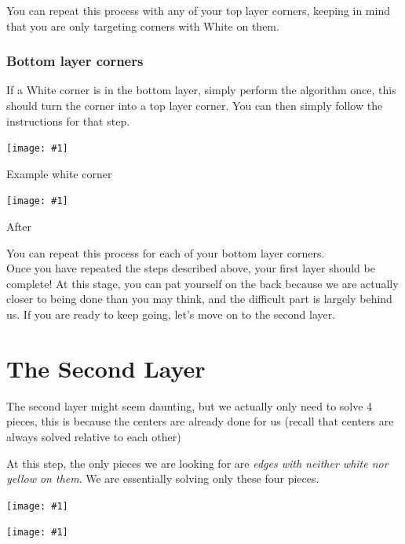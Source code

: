 \documentclass[12pt,letterpaper]{article}
\newcommand{\alg}[1]{
  \tcbox{
    {\tt #1}
  }
}
\newcommand{\pic}[1]{
  \begin{center}
	  \texttt{[image: \#1]}
  \end{center}
}
\newcommand{\npic}[2]{
  \begin{center}
	  \texttt{[image: \#1]}

	  {#2}
  \end{center}
}
\begin{document}
You can repeat this process with any of your top layer corners, keeping in mind
that you are only targeting corners with {\sc White} on them.


\subsubsection{Bottom layer corners}

If a {\sc White} corner is in the bottom layer, simply perform the algorithm
once, this should turn the corner into a top layer corner. You can then simply
follow the instructions for that step.

\begin{multicols}{2}
  \npic{first_layer/bottom_layer_corner_inserted}{Example white corner}

  \npic{first_layer/bottom_layer_corner_out}{After \alg{R U R' U'}}
\end{multicols}

You can repeat this process for each of your bottom layer corners. \\


Once you have repeated the steps described above, your first layer should be
complete! At this stage, you can pat yourself on the back because we are
actually closer to being done than you may think, and the difficult part is largely
behind us. If you are ready to keep going, let's move on to the second layer.



\newpage

\section{The Second Layer}


The second layer might seem daunting, but we actually only need to solve 4
pieces, this is because the centers are already done for us (recall that centers
are always solved relative to each other)

At this step, the only pieces we are looking for are {\it edges with neither
{\sc white} nor {\sc yellow} on them}. We are essentially solving only these
four pieces.

\begin{multicols}{2}

  \pic{second_layer/pieces_1}

  \pic{second_layer/pieces_3}
  
\end{multicols}
\end{document}
